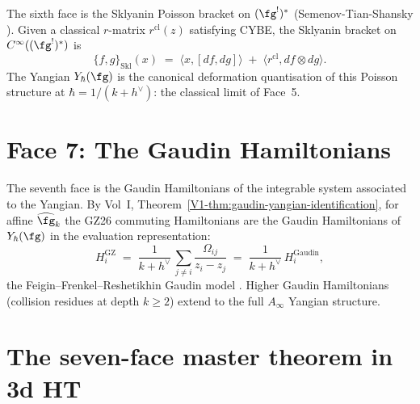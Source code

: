 The sixth face is the Sklyanin Poisson bracket on $(\fg^!)^*$
(Semenov-Tian-Shansky \cite{STS83}). Given a classical $r$-matrix
$r^{\mathrm{cl}}(z)$ satisfying CYBE, the Sklyanin bracket on
$C^\infty((\fg^!)^*)$ is
\[
\{f,g\}_{\mathrm{Skl}}(x)
\;=\;
\langle x,[df,dg]\rangle
\;+\;\langle r^{\mathrm{cl}},df\otimes dg\rangle.
\]
The Yangian $Y_\hbar(\fg)$ is the canonical deformation
quantisation of this Poisson structure at $\hbar = 1/(k+h^\vee)$:
the classical limit of Face~5.

\section{Face 7: The Gaudin Hamiltonians}
\label{sec:face-7-gaudin}

The seventh face is the Gaudin Hamiltonians of the integrable
system associated to the Yangian. By Vol~I,
Theorem~\ref{V1-thm:gaudin-yangian-identification}, for affine
$\widehat{\fg}_k$ the GZ26 commuting Hamiltonians are the Gaudin
Hamiltonians of $Y_\hbar(\fg)$ in the evaluation representation:
\[
H_i^{\mathrm{GZ}}
\;=\;
\frac{1}{k+h^\vee}\,
\sum_{j\neq i}
\frac{\Omega_{ij}}{z_i-z_j}
\;=\;
\frac{1}{k+h^\vee}\,H_i^{\mathrm{Gaudin}},
\]
the Feigin--Frenkel--Reshetikhin Gaudin model \cite{FFR94}. Higher
Gaudin Hamiltonians (collision residues at depth $k\geq 2$) extend
to the full $A_\infty$ Yangian structure.

\section{The seven-face master theorem in 3d HT}
\label{sec:dnp-master-seven-face}

